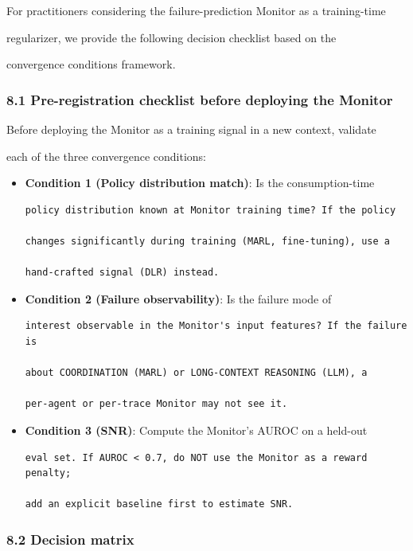 \documentclass[
]{article}
\begin{document}
For practitioners considering the failure-prediction Monitor as a
training-time

regularizer, we provide the following decision checklist based on the

convergence conditions framework.

\subsubsection{8.1 Pre-registration checklist before deploying the
Monitor}\label{pre-registration-checklist-before-deploying-the-monitor}

Before deploying the Monitor as a training signal in a new context,
validate

each of the three convergence conditions:

\begin{itemize}
\item[$\square$]
  \textbf{Condition 1 (Policy distribution match)}: Is the
  consumption-time

\begin{verbatim}
policy distribution known at Monitor training time? If the policy

changes significantly during training (MARL, fine-tuning), use a

hand-crafted signal (DLR) instead.
\end{verbatim}
\item[$\square$]
  \textbf{Condition 2 (Failure observability)}: Is the failure mode of

\begin{verbatim}
interest observable in the Monitor's input features? If the failure is

about COORDINATION (MARL) or LONG-CONTEXT REASONING (LLM), a

per-agent or per-trace Monitor may not see it.
\end{verbatim}
\item[$\square$]
  \textbf{Condition 3 (SNR)}: Compute the Monitor's AUROC on a held-out

\begin{verbatim}
eval set. If AUROC < 0.7, do NOT use the Monitor as a reward penalty;

add an explicit baseline first to estimate SNR.
\end{verbatim}
\end{itemize}

\subsubsection{8.2 Decision matrix}\label{decision-matrix}
\end{document}
